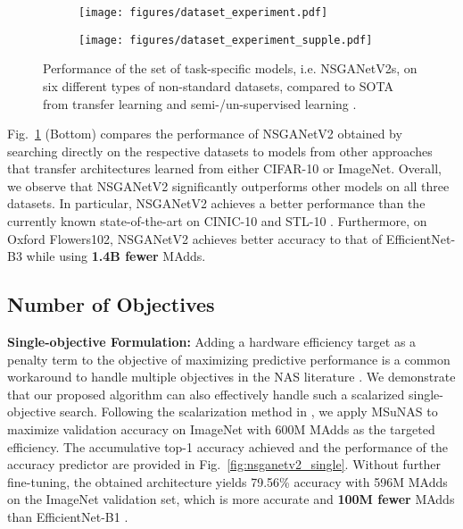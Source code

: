 \documentclass[runningheads]{llncs}
\def\ourmethod{MSuNAS}
\def\ourmodel{NSGANetV2}
\begin{document}
\begin{figure}[t]
    \centering
    \begin{subfigure}{0.95\textwidth}
    \centering
    \texttt{[image: figures/dataset\_experiment.pdf]}
    \end{subfigure}
    \begin{subfigure}{0.95\textwidth}
    \centering
    \texttt{[image: figures/dataset\_experiment\_supple.pdf]}
    \end{subfigure}
\caption{Performance of the set of task-specific models, i.e. \ourmodel{}s, on six different types of non-standard datasets, compared to SOTA from transfer learning \cite{xnas,efficientnet} and semi-/un-supervised learning \cite{mixmatch,wang2019enaet}.\label{fig:non-standard-datasets}}
\end{figure}

Fig.~\ref{fig:non-standard-datasets} (Bottom) compares the performance of \ourmodel{} obtained by searching directly on the respective datasets to models from other approaches that transfer architectures learned from either CIFAR-10 or ImageNet. Overall, we observe that \ourmodel{} significantly outperforms other models on all three datasets. In particular, \ourmodel{} achieves a better performance than the currently known state-of-the-art on CINIC-10 \cite{xnas} and STL-10 \cite{mixmatch}. Furthermore, on Oxford Flowers102, \ourmodel{} achieves better accuracy to that of EfficientNet-B3 \cite{efficientnet} while using \textbf{1.4B fewer} MAdds.

\subsection{Number of Objectives}
\noindent\textbf{Single-objective Formulation:} Adding a hardware efficiency target as a penalty term to the objective of maximizing predictive performance is a common workaround to handle multiple objectives in the NAS literature \cite{proxylessnas,mnasnet,fbnet}. We demonstrate that our proposed algorithm can also effectively handle such a scalarized single-objective search. Following the scalarization method in \cite{mnasnet}, we apply \ourmethod{} to maximize validation accuracy on ImageNet with 600M MAdds as the targeted efficiency. The accumulative top-1 accuracy achieved and the performance of the accuracy predictor are provided in Fig.~\ref{fig:nsganetv2_single}. Without further fine-tuning, the obtained architecture yields 79.56\% accuracy with 596M MAdds on the ImageNet validation set, which is more accurate and \textbf{100M fewer} MAdds than EfficientNet-B1 \cite{efficientnet}.
\end{document}
